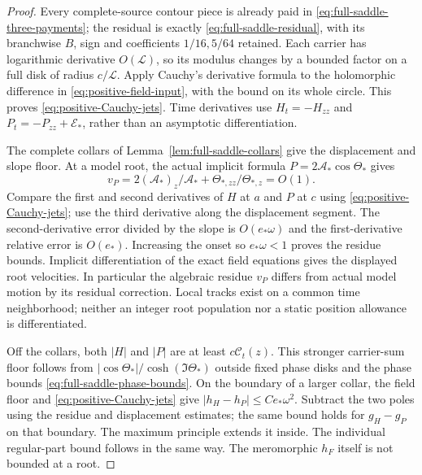 \begin{proof}
Every complete-source contour piece is already paid in
\eqref{eq:full-saddle-three-payments}; the residual is exactly
\eqref{eq:full-saddle-residual}, with its branchwise $B$, sign and
coefficients $1/16,5/64$ retained. Each carrier has logarithmic
derivative $O(\mathcal L)$, so its modulus changes by a bounded factor
on a full disk of radius $c/\mathcal L$.
Apply Cauchy's derivative formula \cite[1.9.31]{DLMFCauchy1931} to the
holomorphic difference in \eqref{eq:positive-field-input}, with the
bound on its whole circle. This proves \eqref{eq:positive-Cauchy-jets}.
Time derivatives use $H_t=-H_{zz}$ and
$P_t=-P_{zz}+\mathcal E_*$, rather than an asymptotic differentiation.

The complete collars of Lemma~\ref{lem:full-saddle-collars} give the
displacement and slope floor. At a model root, the actual implicit
formula $P=2\mathcal A_*\cos\Theta_*$ gives
\[
 v_P=2(\mathcal A_*)_z/\mathcal A_*
                       +\Theta_{*,zz}/\Theta_{*,z}=O(1).
\]
Compare the first and second derivatives of $H$ at $a$ and $P$ at $c$
using \eqref{eq:positive-Cauchy-jets}; use the third derivative along
the displacement segment. The second-derivative error divided by the
slope is $O(e_*\omega)$ and the first-derivative relative error is
$O(e_*)$. Increasing the onset so $e_*\omega<1$ proves the residue
bounds. Implicit differentiation of the exact field equations gives
the displayed root velocities. In particular the algebraic residue
$v_P$ differs from actual model motion by its residual correction.
Local tracks exist on a common time neighborhood; neither an integer
root population nor a static position allowance is differentiated.

Off the collars, both $|H|$ and $|P|$ are at least
$c\mathcal C_t(z)$. This stronger carrier-sum floor follows from
$|\cos\Theta_*|/\cosh(\Im\Theta_*)$ outside fixed phase disks and
the phase bounds \eqref{eq:full-saddle-phase-bounds}.
On the boundary of a larger collar, the field floor and
\eqref{eq:positive-Cauchy-jets} give
$|h_H-h_P|\le Ce_*\omega^2$.
Subtract the two poles using the residue and displacement estimates;
the same bound holds for $g_H-g_P$ on that boundary. The maximum
principle extends it inside. The individual regular-part bound follows
in the same way. The meromorphic $h_F$ itself is not bounded at a root.
\end{proof}

